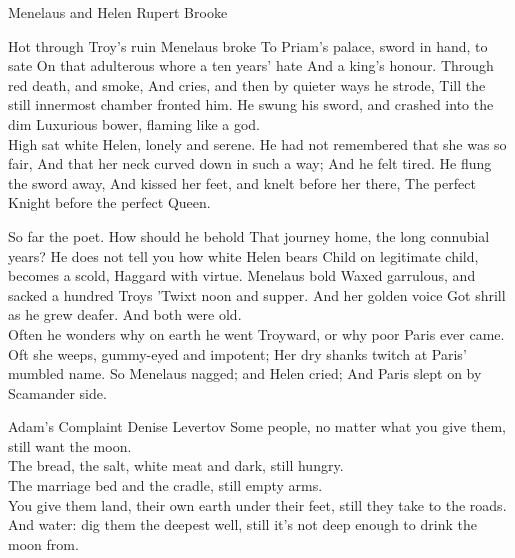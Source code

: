 \begin{poem}
{Menelaus and Helen}
{Rupert Brooke}
\newcommand{\Ind}{\Indent[2em]}


Hot through Troy's ruin Menelaus broke
\Ind   To Priam's palace, sword in hand, to sate
\Ind   On that adulterous whore a ten years' hate
And a king's honour. Through red death, and smoke,
And cries, and then by quieter ways he strode,
\Ind   Till the still innermost chamber fronted him.
\Ind   He swung his sword, and crashed into the dim
Luxurious bower, flaming like a god. \\

High sat white Helen, lonely and serene.
\Ind   He had not remembered that she was so fair,
And that her neck curved down in such a way;
And he felt tired. He flung the sword away,
\Ind   And kissed her feet, and knelt before her there,
The perfect Knight before the perfect Queen. \\



So far the poet. How should he behold
\Ind   That journey home, the long connubial years?
\Ind   He does not tell you how white Helen bears
Child on legitimate child, becomes a scold,
Haggard with virtue. Menelaus bold
\Ind   Waxed garrulous, and sacked a hundred Troys
\Ind   'Twixt noon and supper. And her golden voice
Got shrill as he grew deafer. And both were old. \\

Often he wonders why on earth he went
\Ind   Troyward, or why poor Paris ever came.
Oft she weeps, gummy-eyed and impotent;
\Ind   Her dry shanks twitch at Paris' mumbled name.
So Menelaus nagged; and Helen cried;
And Paris slept on by Scamander side. 
\end{poem}

\begin{poem}
{Adam's Complaint}
{Denise Levertov}
 Some people,
 no matter what you give them,
 still want the moon.\\

 The bread,
 the salt,
 white meat and dark,
 still hungry.\\

 The marriage bed
 and the cradle,
 still empty arms.\\

 You give them land,
 their own earth under their feet,
 still they take to the roads.\\

 And water: dig them the deepest well,
 still it's not deep enough
 to drink the moon from.
\end{poem}



